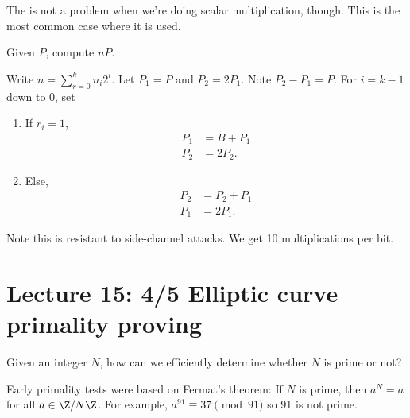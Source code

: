 The is not a problem when we're doing scalar multiplication, though. This is the most common case where it is used.
\begin{alg}
Given $P$, compute $nP$.

Write $n=\sum_{r=0}^kn_i2^i$. Let $P_1=P$ and $P_2=2P_1$. Note $P_2-P_1=P$. For
 $i=k-1$ down to 0, set
\begin{enumerate}
\item
If $r_i=1$,
\begin{align*}
P_1&=B+P_1\\
P_2&=2P_2.
\end{align*}
\item
Else, %
\begin{align*}
P_2&=P_2+P_1\\
P_1&=2P_1.
\end{align*}
\end{enumerate}
Note this is resistant to side-channel attacks. 
We get 10 multiplications per bit.
\end{alg}
\section{Lecture 15: 4/5 Elliptic curve primality proving}
Given an integer $N$, how can we efficiently determine whether $N$ is prime or not? 

Early primality tests were based on Fermat's theorem: If $N$ is prime, then $a^N=a$ for all $a\in \Z/N\Z$. For example, $a^{91}\equiv 37\pmod{91}$ so 91 is not prime.

